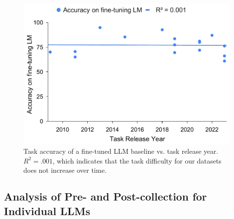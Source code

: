 \documentclass[letterpaper]{article} %
\newcommand{\jmf}[1]{}      %
\newcommand{\cm}[1]{}  %
\begin{document}

\begin{figure}[t!]
          \centering
            \includegraphics[scale=0.35]{img/fine-tune-on-llm.pdf}
    \caption[]%
            {Task accuracy of a fine-tuned LLM baseline vs. task release year. $R^2 = .001$, which indicates that the task difficulty for our datasets does not increase over time. \jmf{compute average performance on pre-2021 and post-2021, and also statistical significance.} \cm{the average score of pre-2021:78.82, post-2021:74.81. Student t-sest: the p-value is 0.221667. The result is not significant at p < 0.05.} }
            \label{fig:fine-tune-on-llm}
\end{figure}

\subsection{Analysis of Pre- and Post-collection for Individual LLMs}
\end{document}

